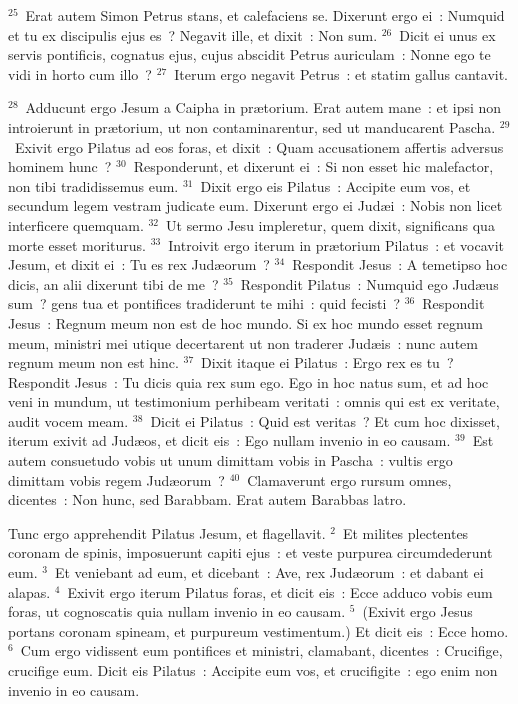 ${}^{25}$~Erat autem Simon Petrus stans, et calefaciens se. Dixerunt ergo ei~: Numquid et tu ex discipulis ejus es~? Negavit ille, et dixit~: Non sum.
${}^{26}$~Dicit ei unus ex servis pontificis, cognatus ejus, cujus abscidit Petrus auriculam~: Nonne ego te vidi in horto cum illo~?
${}^{27}$~Iterum ergo negavit Petrus~: et statim gallus cantavit.


${}^{28}$~Adducunt ergo Jesum a Caipha in pr\ae torium. Erat autem mane~: et ipsi non introierunt in pr\ae torium, ut non contaminarentur, sed ut manducarent Pascha.
${}^{29}$~Exivit ergo Pilatus ad eos foras, et dixit~: Quam accusationem affertis adversus hominem hunc~?
${}^{30}$~Responderunt, et dixerunt ei~: Si non esset hic malefactor, non tibi tradidissemus eum.
${}^{31}$~Dixit ergo eis Pilatus~: Accipite eum vos, et secundum legem vestram judicate eum. Dixerunt ergo ei Jud\ae i~: Nobis non licet interficere quemquam.
${}^{32}$~Ut sermo Jesu impleretur, quem dixit, significans qua morte esset moriturus.
${}^{33}$~Introivit ergo iterum in pr\ae torium Pilatus~: et vocavit Jesum, et dixit ei~: Tu es rex Jud\ae orum~?
${}^{34}$~Respondit Jesus~: A temetipso hoc dicis, an alii dixerunt tibi de me~?
${}^{35}$~Respondit Pilatus~: Numquid ego Jud\ae us sum~? gens tua et pontifices tradiderunt te mihi~: quid fecisti~?
${}^{36}$~Respondit Jesus~: Regnum meum non est de hoc mundo. Si ex hoc mundo esset regnum meum, ministri mei utique decertarent ut non traderer Jud\ae is~: nunc autem regnum meum non est hinc.
${}^{37}$~Dixit itaque ei Pilatus~: Ergo rex es tu~? Respondit Jesus~: Tu dicis quia rex sum ego. Ego in hoc natus sum, et ad hoc veni in mundum, ut testimonium perhibeam veritati~: omnis qui est ex veritate, audit vocem meam.
${}^{38}$~Dicit ei Pilatus~: Quid est veritas~? Et cum hoc dixisset, iterum exivit ad Jud\ae os, et dicit eis~: Ego nullam invenio in eo causam.
${}^{39}$~Est autem consuetudo vobis ut unum dimittam vobis in Pascha~: vultis ergo dimittam vobis regem Jud\ae orum~?
${}^{40}$~Clamaverunt ergo rursum omnes, dicentes~: Non hunc, sed Barabbam. Erat autem Barabbas latro.

\lettrine[lines=3,image=true,loversize=0.05,lraise=-0.03]{T}{}unc ergo apprehendit Pilatus Jesum, et flagellavit.
${}^{2}$~Et milites plectentes coronam de spinis, imposuerunt capiti ejus~: et veste purpurea circumdederunt eum.
${}^{3}$~Et veniebant ad eum, et dicebant~: Ave, rex Jud\ae orum~: et dabant ei alapas.
${}^{4}$~Exivit ergo iterum Pilatus foras, et dicit eis~: Ecce adduco vobis eum foras, ut cognoscatis quia nullam invenio in eo causam.
${}^{5}$~(Exivit ergo Jesus portans coronam spineam, et purpureum vestimentum.) Et dicit eis~: Ecce homo.
${}^{6}$~Cum ergo vidissent eum pontifices et ministri, clamabant, dicentes~: Crucifige, crucifige eum. Dicit eis Pilatus~: Accipite eum vos, et crucifigite~: ego enim non invenio in eo causam.


